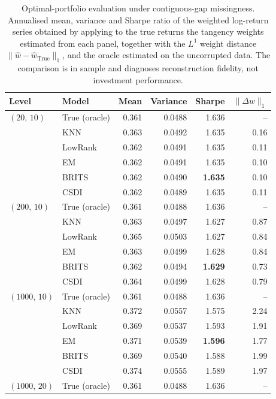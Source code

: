 \begin{table}[htbp]
  \centering
  \footnotesize
  \caption[Optimal-portfolio evaluation under contiguous-gap missingness]{Optimal-portfolio evaluation under contiguous-gap missingness. Annualised mean, variance and Sharpe ratio of the weighted log-return series obtained by applying to the true returns the tangency weights estimated from each panel, together with the $L^1$ weight distance $\lVert \hat w - \hat w_{\text{True}}\rVert_1$, and the oracle estimated on the uncorrupted data. The comparison is in sample and diagnoses reconstruction fidelity, not investment performance.}
  \label{tab:portfolio_gaps}
  \begin{tabular}{llrrrr}
    \toprule
    Level & Model & Mean & Variance & Sharpe & $\lVert \Delta w\rVert_1$ \\
    \midrule
    $(20,\, 10)$ & True (oracle) & 0.361 & 0.0488 & 1.636 & -- \\
     & KNN & 0.363 & 0.0492 & 1.635 & 0.16 \\
     & LowRank & 0.362 & 0.0491 & 1.635 & 0.11 \\
     & EM & 0.362 & 0.0491 & 1.635 & 0.10 \\
     & BRITS & 0.362 & 0.0490 & \textbf{1.635} & 0.10 \\
     & CSDI & 0.362 & 0.0489 & 1.635 & 0.11 \\
    \midrule
    $(200,\, 10)$ & True (oracle) & 0.361 & 0.0488 & 1.636 & -- \\
     & KNN & 0.363 & 0.0497 & 1.627 & 0.87 \\
     & LowRank & 0.365 & 0.0503 & 1.627 & 0.84 \\
     & EM & 0.363 & 0.0499 & 1.628 & 0.84 \\
     & BRITS & 0.362 & 0.0494 & \textbf{1.629} & 0.73 \\
     & CSDI & 0.364 & 0.0499 & 1.628 & 0.79 \\
    \midrule
    $(1000,\, 10)$ & True (oracle) & 0.361 & 0.0488 & 1.636 & -- \\
     & KNN & 0.372 & 0.0557 & 1.575 & 2.24 \\
     & LowRank & 0.369 & 0.0537 & 1.593 & 1.91 \\
     & EM & 0.371 & 0.0539 & \textbf{1.596} & 1.77 \\
     & BRITS & 0.369 & 0.0540 & 1.588 & 1.99 \\
     & CSDI & 0.374 & 0.0555 & 1.589 & 1.97 \\
    \midrule
    $(1000,\, 20)$ & True (oracle) & 0.361 & 0.0488 & 1.636 & -- \\

\end{tabular}
\end{table}
